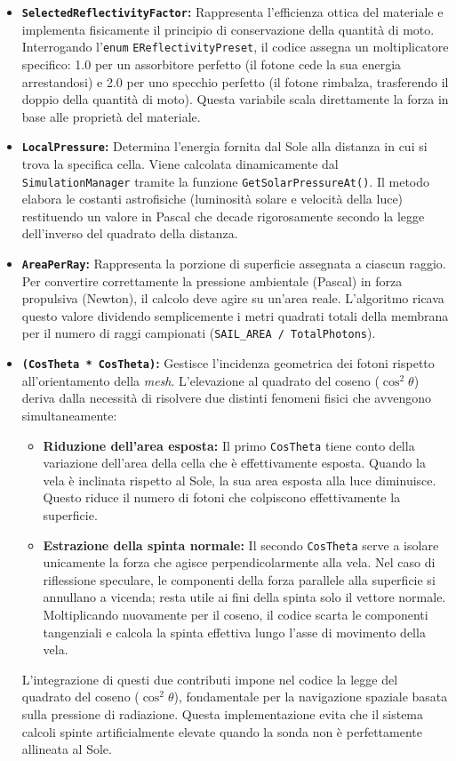 \begin{itemize}
    \item \textbf{\lstinline|SelectedReflectivityFactor|:} Rappresenta l'efficienza ottica del materiale e implementa fisicamente il principio di conservazione della quantità di moto. Interrogando l'\lstinline|enum| \lstinline|EReflectivityPreset|, il codice assegna un moltiplicatore specifico: 1.0 per un assorbitore perfetto (il fotone cede la sua energia arrestandosi) e 2.0 per uno specchio perfetto (il fotone rimbalza, trasferendo il doppio della quantità di moto). Questa variabile scala direttamente la forza in base alle proprietà del materiale.
    \item \textbf{\lstinline|LocalPressure|:} Determina l'energia fornita dal Sole alla distanza in cui si trova la specifica cella. Viene calcolata dinamicamente dal \lstinline|SimulationManager| tramite la funzione \lstinline|GetSolarPressureAt()|. Il metodo elabora le costanti astrofisiche (luminosità solare e velocità della luce) restituendo un valore in Pascal che decade rigorosamente secondo la legge dell'inverso del quadrato della distanza.
    \item \textbf{\lstinline|AreaPerRay|:} Rappresenta la porzione di superficie assegnata a ciascun raggio. Per convertire correttamente la pressione ambientale (Pascal) in forza propulsiva (Newton), il calcolo deve agire su un'area reale. L'algoritmo ricava questo valore dividendo semplicemente i metri quadrati totali della membrana per il numero di raggi campionati (\lstinline|SAIL_AREA / TotalPhotons|).
    \item \textbf{\lstinline|(CosTheta * CosTheta)|:} Gestisce l'incidenza geometrica dei fotoni rispetto all'orientamento della \textit{mesh}. L'elevazione al quadrato del coseno ($\cos^2\theta$) deriva dalla necessità di risolvere due distinti fenomeni fisici che avvengono simultaneamente:
    \begin{itemize}
        \item \textbf{Riduzione dell'area esposta:} Il primo \lstinline|CosTheta| tiene conto della variazione dell'area della cella che è effettivamente esposta. Quando la vela è inclinata rispetto al Sole, la sua area esposta alla luce diminuisce. Questo riduce il numero di fotoni che colpiscono effettivamente la superficie.
        \item \textbf{Estrazione della spinta normale:} Il secondo \lstinline|CosTheta| serve a isolare unicamente la forza che agisce perpendicolarmente alla vela. Nel caso di  riflessione speculare, le componenti della forza parallele alla superficie si annullano a vicenda; resta utile ai fini della spinta solo il vettore normale. Moltiplicando nuovamente per il coseno, il codice scarta le componenti tangenziali e calcola la spinta effettiva lungo l'asse di movimento della vela.
    \end{itemize}
    L'integrazione di questi due contributi impone nel codice la legge del quadrato del coseno ($\cos^2\theta$), fondamentale per la navigazione spaziale basata sulla pressione di radiazione. Questa implementazione evita che il sistema calcoli spinte artificialmente elevate quando la sonda non è perfettamente allineata al Sole.
\end{itemize}


